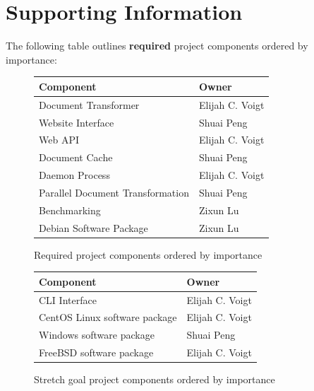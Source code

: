 \section{Supporting Information}


The following table outlines \textbf{required} project components ordered by importance:

\begin{figure}[H]
  \begin{center}
    \begin{tabular}{ | l | l | }
    \hline
      Component & Owner \\ \hline
      Document Transformer & Elijah C. Voigt \\ \hline
      Website Interface & Shuai Peng \\ \hline
      Web API & Elijah C. Voigt \\ \hline
      Document Cache & Shuai Peng \\ \hline
      Daemon Process & Elijah C. Voigt \\ \hline
      Parallel Document Transformation & Shuai Peng\\ \hline
      Benchmarking & Zixun Lu \\ \hline
      Debian Software Package & Zixun Lu \\ \hline
    \end{tabular}
  \end{center}
  \caption{Required project components ordered by importance}
\end{figure}

\begin{figure}[H]
  \begin{center}
    \begin{tabular}{ | l | l | }
    \hline
      Component & Owner \\ \hline
      CLI Interface & Elijah C. Voigt \\ \hline
      CentOS Linux software package & Elijah C. Voigt \\ \hline
      Windows software package & Shuai Peng \\ \hline
      FreeBSD software package & Elijah C. Voigt  \\ \hline
    \end{tabular}
  \end{center}
  \caption{Stretch goal project components ordered by importance}
\end{figure}

